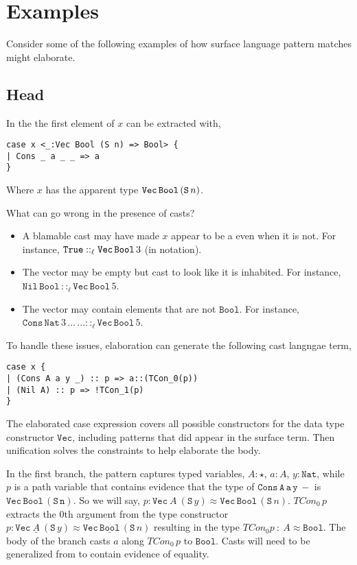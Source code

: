 \section{Examples}
 
Consider some of the following examples of how surface language pattern matches might elaborate.
 
\subsection{Head}
 
In the \slang{} the first element of $x$ can be extracted with,
 
\begin{lstlisting}[basicstyle={\ttfamily\small}]
case x <_:Vec Bool (S n) => Bool> {
| Cons _ a _ _ => a
}
\end{lstlisting}

Where $x$ has the apparent type $\mathtt{Vec}{}\,\mathtt{Bool}{}\,(\mathtt{S}\,n)$.

What can go wrong in the presence of casts?
\begin{itemize}
\item
A blamable cast may have made $x$ appear to be a \Vect{} even when it is not.
For instance, $\mathtt{True}{}::_{\ell}\mathtt{Vec}{}\,\mathtt{Bool}{}\,3$ (in  notation).
\item
The vector may be empty but cast to look like it is inhabited.
For instance, $\mathtt{Nil}\,\mathtt{Bool}\,::_{\ell}\mathtt{Vec}\,\mathtt{Bool}\,5$.
\item
The vector may contain elements that are not $\mathtt{Bool}$.
For instance, $\mathtt{Cons}\,\mathtt{Nat}\,3\,...\,...::_{\ell}\mathtt{Vec}\,\mathtt{Bool}\,5$.
\end{itemize}
 
To handle these issues, elaboration can generate the following cast langngae term,
 
\begin{lstlisting}[basicstyle={\ttfamily\small}]
case x {
| (Cons A a y _) :: p => a::(TCon_0(p))
| (Nil A) :: p => !TCon_1(p)
}
\end{lstlisting}
 
The elaborated case expression covers all possible constructors for the data type constructor $\mathtt{Vec}$, including patterns that did appear in the surface term.
Then unification solves the constraints to help elaborate the body.
 
In the first branch, the pattern captures typed variables, $A:\star$, $a:A$, $y:\mathtt{Nat}$, while $p$ is a path variable that contains evidence that the type of $\mathtt{Cons\,A\,a\,y\,-}$ is $\mathtt{Vec\,Bool\,(S\,n)}$.
So we will say, $p:\mathtt{Vec}\ A\ (\mathtt{S}\,y)\approx\mathtt{Vec}\,\mathtt{Bool}\,(\mathtt{S}\,n)$.
$TCon_{0}\,p$ extracts the 0th argument from the type constructor $p:\mathtt{Vec}\ \underline{A}\ (\mathtt{S}\,y)\approx\mathtt{Vec}\,\underline{\mathtt{Bool}}\,(\mathtt{S}\,n)$ resulting in the type $TCon_{0}p\ :\ A\approx\mathtt{Bool}$.
The body of the branch casts $a$ along $TCon_{0}\,p$ to $\mathtt{Bool}$.
Casts will need to be generalized from  to contain evidence of equality.
 
